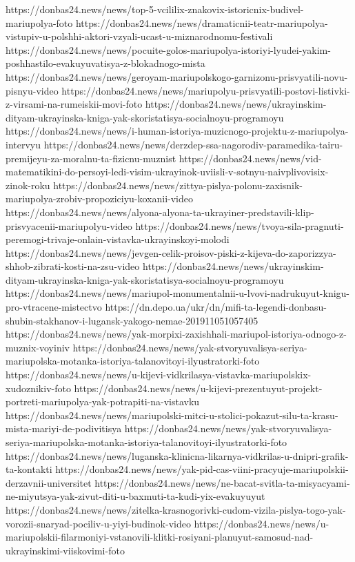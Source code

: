 https://donbas24.news/news/top-5-vcililix-znakovix-istoricnix-budivel-mariupolya-foto
https://donbas24.news/news/dramaticnii-teatr-mariupolya-vistupiv-u-polshhi-aktori-vzyali-ucast-u-miznarodnomu-festivali
https://donbas24.news/news/pocuite-golos-mariupolya-istoriyi-lyudei-yakim-poshhastilo-evakuyuvatisya-z-blokadnogo-mista
https://donbas24.news/news/geroyam-mariupolskogo-garnizonu-prisvyatili-novu-pisnyu-video
https://donbas24.news/news/mariupolyu-prisvyatili-postovi-listivki-z-virsami-na-rumeiskii-movi-foto
https://donbas24.news/news/ukrayinskim-dityam-ukrayinska-kniga-yak-skoristatisya-socialnoyu-programoyu
https://donbas24.news/news/i-human-istoriya-muzicnogo-projektu-z-mariupolya-intervyu
https://donbas24.news/news/derzdep-ssa-nagorodiv-paramedika-tairu-premijeyu-za-moralnu-ta-fizicnu-muznist
https://donbas24.news/news/vid-matematikini-do-persoyi-ledi-visim-ukrayinok-uviisli-v-sotnyu-naivplivovisix-zinok-roku
https://donbas24.news/news/zittya-pislya-polonu-zaxisnik-mariupolya-zrobiv-propoziciyu-koxanii-video
https://donbas24.news/news/alyona-alyona-ta-ukrayiner-predstavili-klip-prisvyacenii-mariupolyu-video
https://donbas24.news/news/tvoya-sila-pragnuti-peremogi-trivaje-onlain-vistavka-ukrayinskoyi-molodi
https://donbas24.news/news/jevgen-celik-proisov-piski-z-kijeva-do-zaporizzya-shhob-zibrati-kosti-na-zsu-video
https://donbas24.news/news/ukrayinskim-dityam-ukrayinska-kniga-yak-skoristatisya-socialnoyu-programoyu
https://donbas24.news/news/mariupol-monumentalnii-u-lvovi-nadrukuyut-knigu-pro-vtracene-mistectvo
https://dn.depo.ua/ukr/dn/mifi-ta-legendi-donbasu-shubin-stakhanov-i-lugansk-yakogo-nemae-201911051057405
https://donbas24.news/news/yak-morpixi-zaxishhali-mariupol-istoriya-odnogo-z-muznix-voyiniv
https://donbas24.news/news/yak-stvoryuvalisya-seriya-mariupolska-motanka-istoriya-talanovitoyi-ilyustratorki-foto
https://donbas24.news/news/u-kijevi-vidkrilasya-vistavka-mariupolskix-xudoznikiv-foto
https://donbas24.news/news/u-kijevi-prezentuyut-projekt-portreti-mariupolya-yak-potrapiti-na-vistavku
https://donbas24.news/news/mariupolski-mitci-u-stolici-pokazut-silu-ta-krasu-mista-mariyi-de-podivitisya
https://donbas24.news/news/yak-stvoryuvalisya-seriya-mariupolska-motanka-istoriya-talanovitoyi-ilyustratorki-foto
https://donbas24.news/news/luganska-klinicna-likarnya-vidkrilas-u-dnipri-grafik-ta-kontakti
https://donbas24.news/news/yak-pid-cas-viini-pracyuje-mariupolskii-derzavnii-universitet
https://donbas24.news/news/ne-bacat-svitla-ta-misyacyami-ne-miyutsya-yak-zivut-diti-u-baxmuti-ta-kudi-yix-evakuyuyut
https://donbas24.news/news/zitelka-krasnogorivki-cudom-vizila-pislya-togo-yak-vorozii-snaryad-pociliv-u-yiyi-budinok-video
https://donbas24.news/news/u-mariupolskii-filarmoniyi-vstanovili-klitki-rosiyani-planuyut-samosud-nad-ukrayinskimi-viiskovimi-foto

